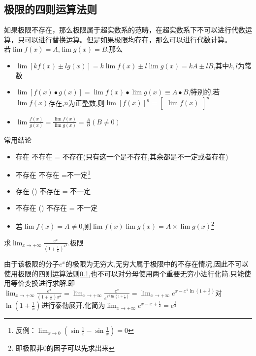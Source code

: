 \documentclass[12pt, a4paper, oneside, UTF8]{ctexbook}
\begin{document}
\begin{sloppypar}
    \subsection{极限的四则运算法则}\label{jxdsz1}
    如果极限不存在，那么极限属于超实数系的范畴，在超实数系下不可以进行代数运算，只可以进行替换运算。但是如果极限均存在，那么可以进行代数计算。\\
    若$\lim f(x)=A$,$\lim g(x)=B$,那么
    \begin{itemize}
        \item $\operatorname*{lim}[kf(x)\pm lg(x)]=k\operatorname*{lim}f(x)\pm l\operatorname*{lim}g(x)=kA\pm lB$,其中$k,l$为常数
        \item $\operatorname*{lim}[f(x)\bullet g(x)]=\operatorname*{lim}f(x)\bullet\operatorname*{lim}g(x)\equiv A\bullet B$,特别的,若$\lim f(x)$存在,$n$为正整数,则$\operatorname{lim}[f(x)]^n=\begin{bmatrix}\operatorname{lim}f(x)\end{bmatrix}^n$
        \item $\operatorname*{lim}\frac{f(x)}{g(x)}=\frac{\operatorname*{lim}f(x)}{\operatorname*{lim}g(x)}=\frac{A}{B}(B\neq0)$
    \end{itemize}
    \begin{criterion}{常用结论}{}
        \begin{itemize}
            \item 存在 \pm 不存在 = 不存在(只有这一个是不存在,其余都是不一定或者存在)
            \item 不存在 \pm 不存在 =不一定\footnote{反例：$\lim _{x \to 0}(\sin \frac{1}{x}-\sin \frac{1}{x})=0$}
            \item 存在 \times (\div) 不存在 = 不一定
            \item 不存在 \times (\div) 不存在 = 不一定
            \item 若$\lim f(x) = A \neq 0$,则$\lim f(x)\lim g(x)=A \times \lim g(x)$\footnote{即极限非0的因子可以先求出来}
        \end{itemize}
    \end{criterion}
    \begin{problem}
        求$\lim_{x\to+\infty}\frac{e^x}{\left(1+\frac1x\right)^{x^2}}.$极限
    \end{problem}
    \begin{solution}
        由于该极限的分子$e^x$的极限为无穷大,无穷大属于极限中的不存在情况,因此不可以使用极限的四则运算法则\ref{jxdsz1},也不可以对分母使用两个重要无穷小进行化简.只能使用等价变换进行求解.即$\lim _{x\to +\infty}\frac{e^x}{(1+\frac{1}{x})x^2}=\lim_{x\to +\infty}\frac{e^x}{e^{x^2 \ln (1+\frac{1}{x})}}=\lim_{x\to +\infty} e^{x-x^2\ln(1+\frac{1}{x})}$对$\ln(1+\frac{1}{x})$进行泰勒展开,化简为$\lim_{x\to +\infty} e^{x-x+\frac{1}{2}}=e^{\frac{1}{2}}$

\end{solution}
\end{sloppypar}
\end{document}
